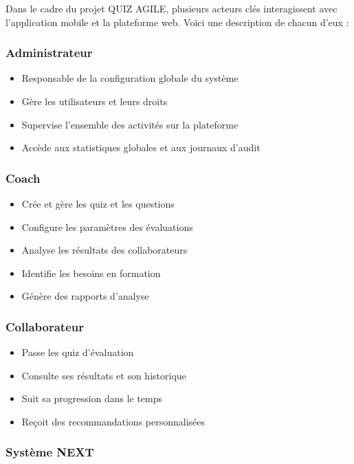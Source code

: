 \documentclass[12pt,a4paper]{report}
\begin{document}
Dans le cadre du projet QUIZ AGILE, plusieurs acteurs clés interagissent avec l'application mobile et la plateforme web. Voici une description de chacun d'eux :

\subsubsection{Administrateur}

\begin{itemize}
\item Responsable de la configuration globale du système
\item Gère les utilisateurs et leurs droits
\item Supervise l'ensemble des activités sur la plateforme
\item Accède aux statistiques globales et aux journaux d'audit
\end{itemize}

\subsubsection{Coach}

\begin{itemize}
\item Crée et gère les quiz et les questions
\item Configure les paramètres des évaluations
\item Analyse les résultats des collaborateurs
\item Identifie les besoins en formation
\item Génère des rapports d'analyse
\end{itemize}

\subsubsection{Collaborateur}

\begin{itemize}
\item Passe les quiz d'évaluation
\item Consulte ses résultats et son historique
\item Suit sa progression dans le temps
\item Reçoit des recommandations personnalisées
\end{itemize}

\subsubsection{Système NEXT}
\end{document}
